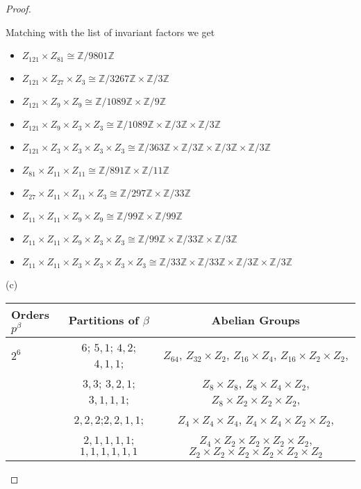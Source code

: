 \documentclass[10pt]{article}
\newcommand{\Z}{\mathbb{Z}}
\begin{document}
\begin{itemize}
\begin{proof}
\begin{item}
Matching with the list of invariant factors we get
\begin{itemize}
	\item $Z_{121} \times Z_{81} \cong \Z / 9801\Z$
	\item $Z_{121} \times Z_{27} \times Z_3 \cong\Z / 3267\Z \times \Z / 3\Z$
	\item $Z_{121} \times Z_9 \times Z_9 \cong \Z / 1089\Z \times \Z / 9\Z$ 
	\item $Z_{121} \times Z_9 \times Z_3 \times Z_3 \cong \Z / 1089\Z \times \Z / 3\Z \times \Z / 3\Z$
	\item $Z_{121} \times Z_3 \times Z_3 \times Z_3 \times Z_3 \cong \Z / 363\Z \times \Z / 3\Z \times \Z / 3\Z \times \Z / 3\Z$
	\item $Z_{81} \times Z_{11} \times Z_{11} \cong \Z / 891\Z \times \Z / 11\Z$
	\item $Z_{27} \times Z_{11} \times Z_{11} \times Z_3 \cong \Z / 297\Z \times \Z / 33\Z$
	\item $Z_{11} \times Z_{11} \times Z_9 \times Z_9 \cong \Z / 99\Z \times \Z / 99\Z$ 
	\item $Z_{11} \times Z_{11} \times Z_9 \times Z_3 \times Z_3 \cong \Z / 99\Z \times \Z / 33\Z \times \Z / 3\Z$
	\item $Z_{11} \times Z_{11} \times Z_3 \times Z_3 \times Z_3 \times Z_3 \cong \Z / 33\Z \times \Z / 33\Z \times \Z / 3\Z \times \Z / 3\Z$
\end{itemize}


\end{item}

\begin{item} (c)
\begin{center}
  \begin{tabular}{ l c  c  }
    Orders $p^{\beta}$ & Partitions of $\beta$ & Abelian Groups\\ \hline
    $2^6$ & $6$; $5,1$; $4,2$; $4,1,1$; & $Z_{64}$, $Z_{32} \times Z_2 $, $Z_{16} \times Z_4$, $Z_{16} \times Z_2 \times Z_2$,\\
      
		
		 $\text{ }$ & $3,3$; $3,2,1$; $3,1,1,1$; & $Z_8 \times Z_8$,  $Z_8 \times Z_4 \times Z_2$, $Z_8 \times Z_2 \times Z_2 \times Z_2$,\\
		
	  	$\text{ }$ & $2,2,2$;$2,2,1,1$;  &  $Z_4 \times Z_4 \times Z_4$, $Z_4 \times Z_4 \times Z_2 \times Z_2$,  \\
		
		
			$\text{ }$ & $2,1,1,1,1$; $1,1,1,1,1,1$ & $Z_4 \times Z_2 \times Z_2 \times Z_2 \times Z_2$, $Z_2 \times Z_2 \times Z_2 \times Z_2 \times Z_2 \times Z_2$\\ \hline
		

\end{tabular}
\end{center}
\end{item}
\end{proof}
\end{itemize}
\end{document}
